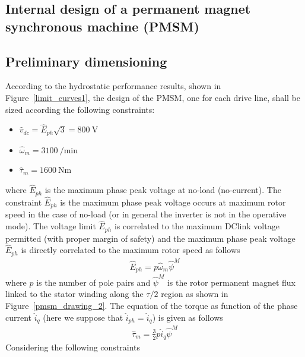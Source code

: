 \documentclass[12pt,a4paper,oneside]{book}
\begin{document}
\begin{onehalfspace}
\chapter{Internal design of a permanent magnet synchronous machine (PMSM)}

\section{Preliminary dimensioning}

According to the hydrostatic performance results, shown in Figure~\ref{limit_curves1}, the design of the PMSM, one for each drive line, shall be sized according the following constraints:\\
\begin{itemize}
	\item $\hat{v}_{dc}=\hat{E}_{ph}\sqrt{3}=\SI{800}{\volt}$   
	\item $\hat{\omega}_{m}=\SI{3100}{\per\minute}$
	\item $\hat{\tau}_{m}=\SI{1600}{\newton\meter}$\\
\end{itemize}
where $\hat{E}_{ph}$ is the maximum phase peak voltage at no-load (no-current).
The constraint $\hat{E}_{ph}$ is the maximum phase peak voltage occurs at maximum rotor speed in the case of no-load (or in general the inverter is not in the operative mode). The voltage limit $\hat{E}_{ph}$ is correlated to the maximum DClink voltage permitted (with proper margin of safety) and the maximum phase peak voltage $\hat{E}_{ph}$ is directly correlated to the maximum rotor speed as follows
\begin{equation}
	\begin{aligned}
		\hat{E}_{ph} = p\hat{\omega}_m\hat{\psi}^M
	\end{aligned}
\end{equation}
where $p$ is the number of pole pairs and $\hat{\psi}^M$ is the rotor permanent magnet flux linked to the stator winding along the $\tau/2$ region as shown in Figure~\ref{pmsm_drawing_2}.
The equation of the torque as function of the phase current $\hat{i}_{q}$ (here we suppose that $\hat{i}_{ph}=\hat{i}_{q}$) is given as follows
\begin{equation}
	\begin{aligned}
		\hat{\tau}_{m} = \frac{3}{2}p\hat{i}_q\hat{\psi}^M
	\end{aligned}
\end{equation}
Considering the following constraints
\begin{itemize}

\end{itemize}
\end{onehalfspace}
\end{document}
